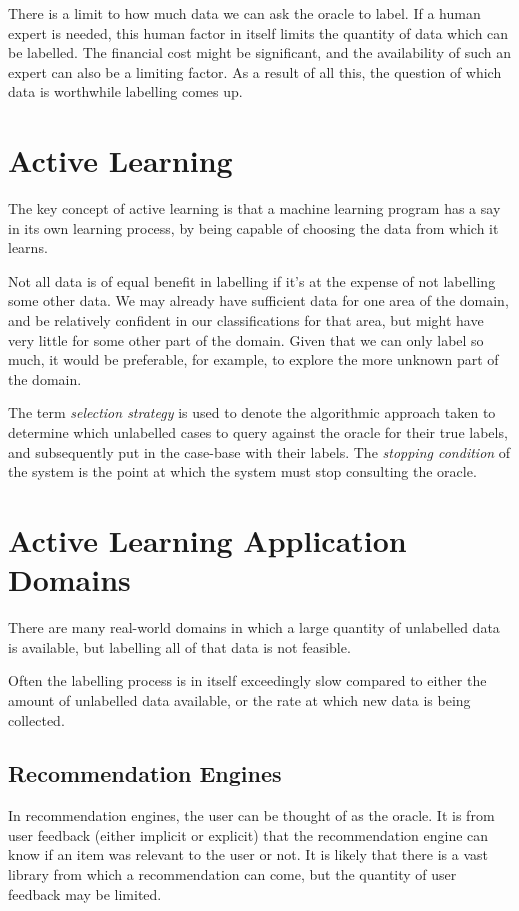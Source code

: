 \documentclass[a4paper,11pt]{report}
\begin{document}
There is a limit to how much data we can ask the oracle to label. If a human expert is needed, this human factor in itself limits the quantity of data which can be labelled. The financial cost might be significant, and the availability of such an expert can also be a limiting factor. As a result of all this, the question of which data is worthwhile labelling comes up.

\section{Active Learning}
The key concept of active learning is that a machine learning program has a say in its own learning process, by being capable of choosing the data from which it learns. 

Not all data is of equal benefit in labelling if it's at the expense of not labelling some other data. We may already have sufficient data for one area of the domain, and be relatively confident in our classifications for that area, but might have very little for some other part of the domain. Given that we can only label so much, it would be preferable, for example, to explore the more unknown part of the domain.

The term \emph{selection strategy} is used to denote the algorithmic approach taken to determine which unlabelled cases to query against the oracle for their true labels, and subsequently put in the case-base with their labels. The \emph{stopping condition} of the system is the point at which the system must stop consulting the oracle.

\section{Active Learning Application Domains}

There are many real-world domains in which a large quantity of unlabelled data is available, but labelling all of that data is not feasible. 

Often the labelling process is in itself exceedingly slow compared to either the amount of unlabelled data available, or the rate at which new data is being collected. 

\subsection{Recommendation Engines}
In recommendation engines, the user can be thought of as the oracle. It is from user feedback (either implicit or explicit) that the recommendation engine can know if an item was relevant to the user or not. It is likely that there is a vast library from which a recommendation can come, but the quantity of user feedback may be limited.
\end{document}
